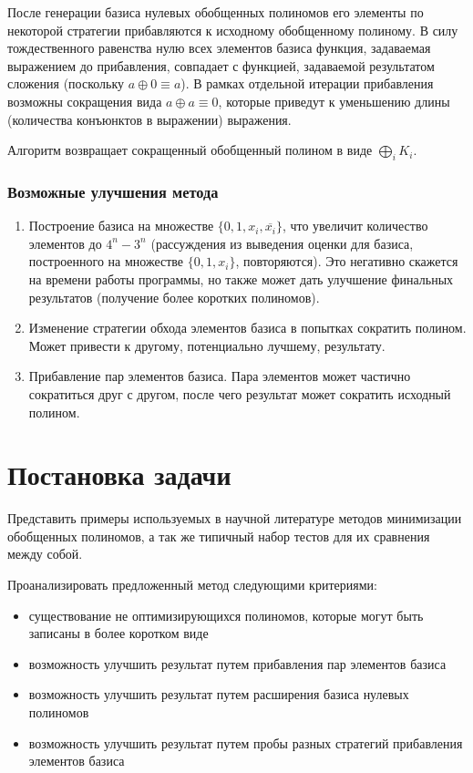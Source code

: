 \documentclass[a4paper,12pt,titlepage,finall]{article}
\begin{document}
После генерации базиса нулевых обобщенных полиномов его элементы по некоторой стратегии прибавляются к исходному обобщенному полиному. В силу тождественного равенства нулю всех элементов базиса функция, задаваемая выражением до прибавления, совпадает с функцией, задаваемой результатом сложения (поскольку $ a \oplus 0 \equiv a $). В рамках отдельной итерации прибавления возможны сокращения вида $ a \oplus a \equiv 0 $, которые приведут к уменьшению длины (количества конъюнктов в выражении) выражения.

Алгоритм возвращает сокращенный обобщенный полином в виде $ \bigoplus\limits_i K_i $.

\subsubsection*{Возможные улучшения метода}

\begin{enumerate}
    \item Построение базиса на множестве $ \{ 0, 1, x_i, \overline{x_i} \} $, что увеличит количество элементов до $ 4^n - 3^n $ (рассуждения из выведения оценки для базиса, построенного на множестве $ \{ 0, 1, x_i \} $, повторяются). Это негативно скажется на времени работы программы, но также может дать улучшение финальных результатов (получение более коротких полиномов).
    \item Изменение стратегии обхода элементов базиса в попытках сократить полином. Может привести к другому, потенциально лучшему, результату.
    \item Прибавление пар элементов базиса. Пара элементов может частично сократиться друг с другом, после чего результат может сократить исходный полином.
\end{enumerate}

\section{Постановка задачи}


Представить примеры используемых в научной литературе методов минимизации обобщенных полиномов, а так же типичный набор тестов для их сравнения между собой.

Проанализировать предложенный метод следующими критериями:
\begin{itemize}
    \item существование не оптимизирующихся полиномов, которые могут быть записаны в более коротком виде
    \item возможность улучшить результат путем прибавления пар элементов базиса
    \item возможность улучшить результат путем расширения базиса нулевых полиномов
    \item возможность улучшить результат путем пробы разных стратегий прибавления элементов базиса
\end{itemize}
\end{document}
